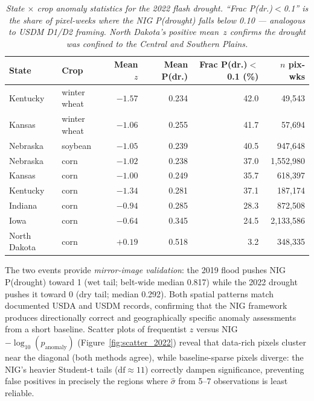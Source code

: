 \documentclass{article}
\begin{document}
\begin{table}[htbp]
\centering
\begin{tabular}{llrrrr}
\hline
\textbf{State} & \textbf{Crop}
  & \textbf{Mean $z$}
  & \textbf{Mean P(dr.)}
  & \textbf{Frac P(dr.)$<$0.1 (\%)}
  & \textbf{$n$ pix-wks} \\
\hline
Kentucky     & winter wheat & $-1.57$ & 0.234 & 42.0 &   49{,}543 \\
Kansas       & winter wheat & $-1.06$ & 0.255 & 41.7 &   57{,}694 \\
Nebraska     & soybean      & $-1.05$ & 0.239 & 40.5 &  947{,}648 \\
Nebraska     & corn         & $-1.02$ & 0.238 & 37.0 & 1{,}552{,}980 \\
Kansas       & corn         & $-1.00$ & 0.249 & 35.7 &  618{,}397 \\
Kentucky     & corn         & $-1.34$ & 0.281 & 37.1 &  187{,}174 \\
Indiana      & corn         & $-0.94$ & 0.285 & 28.3 &  872{,}508 \\
Iowa         & corn         & $-0.64$ & 0.345 & 24.5 & 2{,}133{,}586 \\
North Dakota & corn         & $+0.19$ & 0.518 &  3.2 &  348{,}335 \\
\hline
\end{tabular}
\caption{\textit{State $\times$ crop anomaly statistics for the 2022
flash drought. ``Frac P(dr.)$<$0.1'' is the share of pixel-weeks
where the NIG P(drought) falls below 0.10 --- analogous to USDM
D1/D2 framing.
North Dakota's positive mean~$z$ confirms the drought was confined to
the Central and Southern Plains.}}
\label{tab:drought_impact}
\end{table}

The two events provide \textit{mirror-image validation}: the 2019 flood
pushes NIG P(drought) toward 1 (wet tail; belt-wide median 0.817)
while the 2022 drought pushes it toward 0 (dry tail; median 0.292).
Both spatial patterns match documented USDA and USDM records,
confirming that the NIG framework produces directionally correct and
geographically specific anomaly assessments from a short baseline.
Scatter plots of frequentist $z$ versus NIG
$-\log_{10}(p_{\text{anomaly}})$ (Figure~\ref{fig:scatter_2022})
reveal that data-rich pixels cluster near the diagonal (both methods
agree), while baseline-sparse pixels diverge: the NIG's heavier
Student-t tails ($\text{df} \approx 11$) correctly dampen significance,
preventing false positives in precisely the regions where
$\hat{\sigma}$ from 5--7 observations is least reliable.
\end{document}
